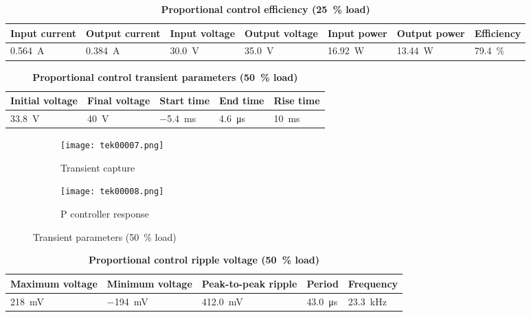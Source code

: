 \begin{table}[H]
    \centering
    \caption{\textbf{Proportional control efficiency (\qty{25}{\percent} load)}}
    \begin{tabularx}{\columnwidth}{|X|X|X|X|X|X|X|}
        \hline
        Input current        & Output current       & Input voltage  & Output voltage & Input power        & Output power       & Efficiency           \\
        \hline
        \qty{0.564}{\ampere} & \qty{0.384}{\ampere} & \qty{30.0}{\V} & \qty{35.0}{\V} & \qty{16.92}{\watt} & \qty{13.44}{\watt} & \qty{79.4}{\percent} \\
        \hline
    \end{tabularx}
\end{table}

\begin{table}[H]
    \centering
    \caption{\textbf{Proportional control transient parameters (\qty{50}{\percent} load)}}
    \begin{tabularx}{\columnwidth}{|X|X|X|X|X|}
        \hline
        Initial voltage   & Final voltage   & Start time      & End time       & Rise time     \\
        \hline
        \qty{33.8}{\volt} & \qty{40}{\volt} & \qty{-5.4}{\ms} & \qty{4.6}{\us} & \qty{10}{\ms} \\
        \hline
    \end{tabularx}
\end{table}
\begin{figure}[H]
    \begin{subfigure}{0.5\textwidth}
        \texttt{[image: tek00007.png]}
        \caption{Transient capture}
    \end{subfigure}
    \hfill
    \begin{subfigure}{0.5\textwidth}
        \texttt{[image: tek00008.png]}
        \caption{P controller response}
        \label{fig:prop50control}
    \end{subfigure}
    \caption{Transient parameters (\qty{50}{\percent} load)}

\end{figure}

\begin{table}[H]
    \centering
    \caption{\textbf{Proportional control ripple voltage (\qty{50}{\percent} load)}}
    \begin{tabularx}{\columnwidth}{|X|X|X|X|X|}
        \hline
        Maximum voltage        & Minimum voltage         & Peak-to-peak ripple & Period          & Frequency        \\
        \hline
        \qty{218}{\milli\volt} & \qty{-194}{\milli\volt} & \qty{412.0}{\mV}    & \qty{43.0}{\us} & \qty{23.3}{\kHz} \\
        \hline
    \end{tabularx}
    \label{table:prop50ripple}
\end{table}

